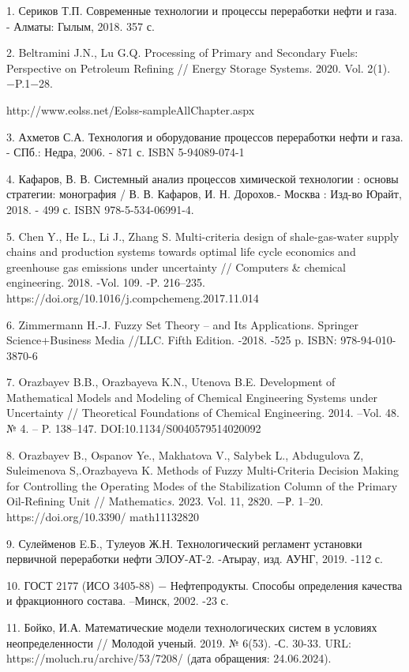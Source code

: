 \begin{noparindent}

1. Сериков Т.П. Современные технологии и процессы переработки нефти и
газа. - Алматы: Гылым, 2018. 357 с.

2. Beltramini J.N., Lu G.Q. Processing of Primary and Secondary Fuels:
Perspective on Petroleum Refining // Energy Storage Systems. 2020. Vol.
2(1). −P.1−28.

http://www.eolss.net/Eolss-sampleAllChapter.aspx

3. Ахметов С.А. Технология и оборудование процессов переработки нефти и
газа. - СПб.: Недра, 2006. - 871 с. ISBN 5-94089-074-1

4. Кафаров, В. В. Системный анализ процессов химической технологии :
основы стратегии: монография / В. В. Кафаров, И. Н. Дорохов.- Москва :
Изд-во Юрайт, 2018. - 499 с. ISBN 978-5-534-06991-4.

5. Chen Y., He L., Li J., Zhang S. Multi-criteria design of
shale-gas-water supply chains and production systems towards optimal
life cycle economics and greenhouse gas emissions under uncertainty //
Computers \& chemical engineering. 2018. -Vol. 109. -P. 216--235.
https://doi.org/10.1016/j.compchemeng.2017.11.014

6. Zimmermann H.-J. Fuzzy Set Theory -- and Its Applications. Springer
Science+Business Media //LLC. Fifth Edition. -2018. -525 p. ISBN:
978-94-010-3870-6

7. Orazbayev B.B., Orazbayeva K.N., Utenova B.E. Development of
Mathematical Models and Modeling of Chemical Engineering Systems under
Uncertainty // Theoretical Foundations of Chemical Engineering. 2014.
--Vol. 48. № 4. -- P. 138--147. DOI:10.1134/S0040579514020092

8. Orazbayev B., Ospanov Ye., Makhatova V., Salybek L., Abdugulova Z,
Suleimenova S,.Orazbayeva K. Methods of Fuzzy Multi-Criteria Decision
Making for Controlling the Operating Modes of the Stabilization Column
of the Primary Oil-Refining Unit // Mathematic\emph{s.} 2023. Vol. 11,
2820. −Р. 1--20. https://doi.org/10.3390/ math11132820

9. Сулейменов E.Б., Tулеуов Ж.Н. Технологический регламент установки
первичной переработки нефти ЭЛОУ-АТ-2. -Атырау, изд. АУНГ, 2019. -112 с.

10. ГОСТ 2177 (ИСО 3405-88) − Нефтепродукты. Способы определения
качества и фракционного состава. --Минск, 2002. -23 с.

11. Бойко, И.А. Математические модели технологических систем в условиях
неопределенности // Молодой ученый. 2019. № 6(53). -С. 30-33. URL:
https://moluch.ru/archive/53/7208/ (дата обращения: 24.06.2024).


\end{noparindent}
